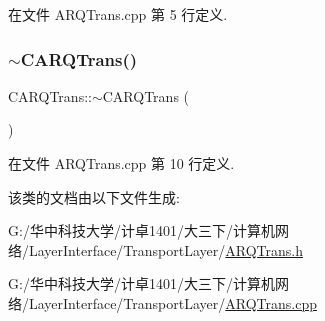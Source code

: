 在文件 A\+R\+Q\+Trans.\+cpp 第 5 行定义.

\mbox{\label{class_c_a_r_q_trans_ac24aad04086bf8256bd36b6f8ab09512}} 
\subsubsection{\texorpdfstring{$\sim$\+C\+A\+R\+Q\+Trans()}{~CARQTrans()}}
{\footnotesize\ttfamily C\+A\+R\+Q\+Trans\+::$\sim$\+C\+A\+R\+Q\+Trans (\begin{DoxyParamCaption}{ }\end{DoxyParamCaption})}



在文件 A\+R\+Q\+Trans.\+cpp 第 10 行定义.



该类的文档由以下文件生成\+:\begin{DoxyCompactItemize}
\item 
G\+:/华中科技大学/计卓1401/大三下/计算机网络/\+Layer\+Interface/\+Transport\+Layer/\hyperlink{_a_r_q_trans_8h}{A\+R\+Q\+Trans.\+h}\item 
G\+:/华中科技大学/计卓1401/大三下/计算机网络/\+Layer\+Interface/\+Transport\+Layer/\hyperlink{_a_r_q_trans_8cpp}{A\+R\+Q\+Trans.\+cpp}\end{DoxyCompactItemize}
